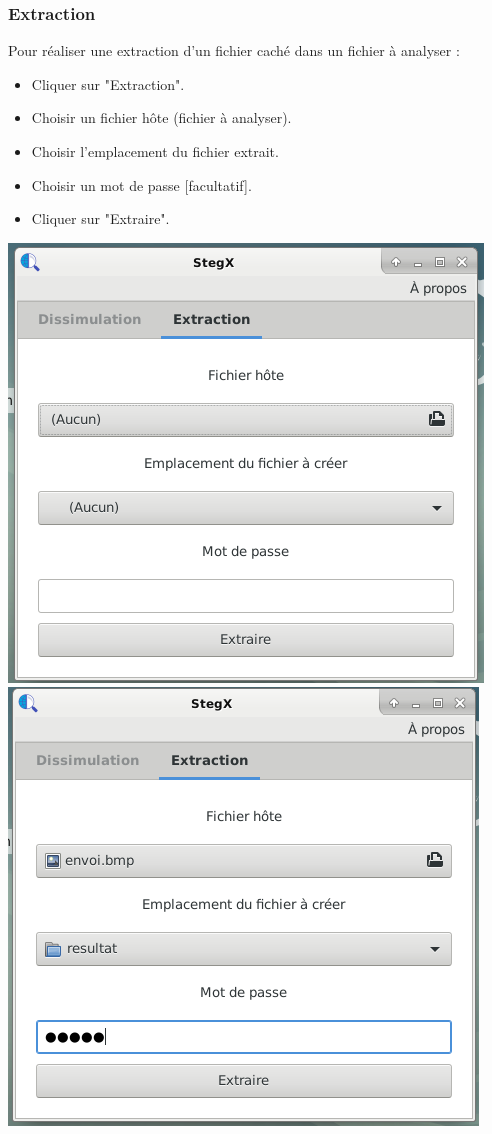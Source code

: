 \documentclass[11pt]{article}
\begin{document}
\subsubsection{Extraction}

Pour réaliser une extraction d'un fichier caché dans un fichier à analyser : 
\begin{itemize}
\item Cliquer sur "Extraction".
\item Choisir un fichier hôte (fichier à analyser). 
\item Choisir l'emplacement du fichier extrait. 
\item Choisir un mot de passe [facultatif]. 
\item Cliquer sur "Extraire". 
\end{itemize}

\vspace{1cm}
\hspace{-2cm}
\includegraphics[scale=0.8]{pictures/extraction_1.png}
\vspace{1cm}
\hspace{0.2cm}
\includegraphics[scale=0.8]{pictures/extraction_2.png}
\end{document}
